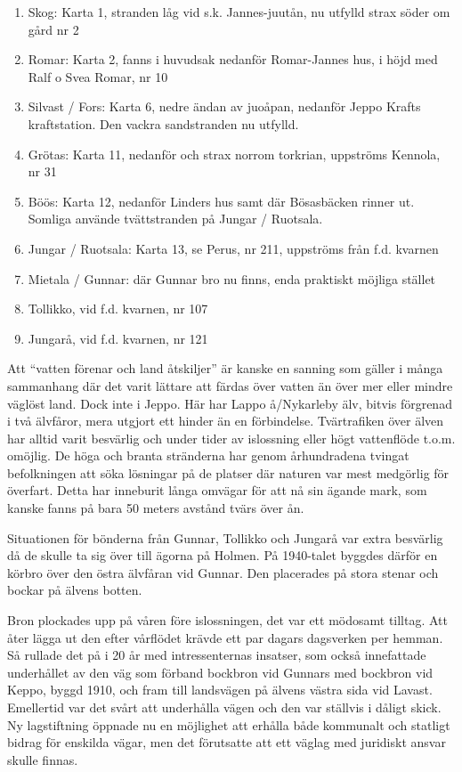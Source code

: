 \begin{enumerate}
  \item Skog: Karta 1, stranden låg vid s.k. Jannes-juutån, nu utfylld strax söder om gård nr 2
  \item Romar: Karta 2, fanns i huvudsak nedanför Romar-Jannes hus, i höjd med Ralf o Svea Romar, nr 10
  \item Silvast / Fors: Karta 6, nedre ändan av juoåpan, nedanför Jeppo Krafts kraftstation. Den vackra sandstranden nu utfylld.
  \item Grötas: Karta 11, nedanför och strax norrom torkrian, uppströms Kennola, nr 31
  \item Böös: Karta 12, nedanför Linders hus samt där Bösasbäcken rinner ut. Somliga använde tvättstranden på Jungar / Ruotsala.
  \item Jungar / Ruotsala: Karta 13, se Perus, nr 211, uppströms från f.d. kvarnen
  \item Mietala / Gunnar: där Gunnar bro nu finns, enda praktiskt möjliga stället
  \item Tollikko, vid f.d. kvarnen, nr 107
  \item Jungarå, vid f.d. kvarnen, nr 121
\end{enumerate}


%

Att ``vatten förenar och land åtskiljer'' är kanske en sanning som gäller i många sammanhang där det varit lättare att färdas över vatten än över mer eller mindre väglöst land. Dock inte i Jeppo. Här har Lappo å/Nykarleby älv, bitvis förgrenad i två älvfåror, mera utgjort ett hinder än en förbindelse. Tvärtrafiken över älven har alltid varit besvärlig och under tider av islossning eller högt vattenflöde t.o.m. omöjlig. De höga och branta stränderna har genom århundradena tvingat befolkningen att söka lösningar på de platser där naturen var mest medgörlig för överfart. Detta har inneburit långa omvägar för att nå sin ägande mark, som kanske fanns på bara 50 meters avstånd tvärs över ån.

Situationen för bönderna från Gunnar, Tollikko och Jungarå var extra besvärlig då de skulle ta sig över till ägorna på Holmen. På 1940-talet byggdes därför en körbro över den östra älvfåran vid Gunnar. Den placerades på stora stenar och bockar på älvens botten.

Bron plockades upp på våren före islossningen, det var ett mödosamt tilltag. Att åter lägga ut den efter vårflödet krävde ett par dagars dagsverken per hemman. Så rullade det på i 20 år med intressenternas insatser, som också innefattade underhållet av den väg som förband bockbron vid Gunnars med bockbron vid Keppo, byggd 1910, och fram till landsvägen på älvens västra sida vid Lavast. Emellertid var det svårt att underhålla vägen och den var ställvis i dåligt skick. Ny lagstiftning öppnade nu en möjlighet att erhålla både kommunalt och statligt bidrag för enskilda vägar, men det förutsatte att ett väglag med juridiskt ansvar skulle finnas.


